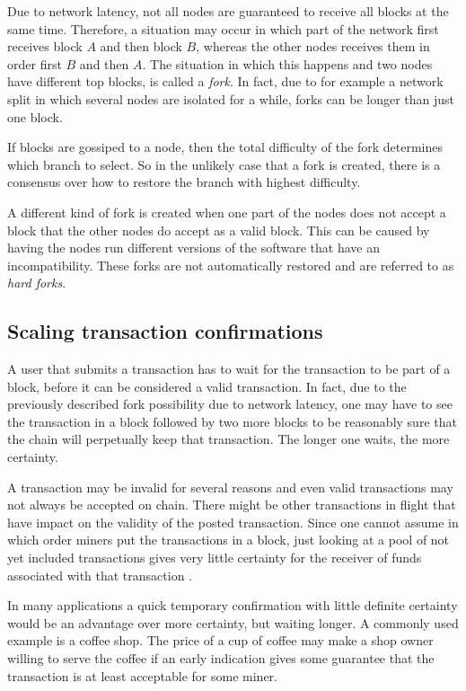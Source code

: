 Due to network latency, not all nodes are guaranteed to receive
all blocks at the same time.  Therefore, a situation may occur in
which part of the network first receives block $A$ and then block $B$,
whereas the other nodes receives them in order first $B$ and then
$A$. The situation in which this happens and two nodes have different
top blocks, is called a \textit{fork}. In fact, due to for example a network
split in which several nodes are isolated for a while, forks can be
longer than just one block.

If blocks are gossiped to a node, then the total
difficulty of the fork determines
which branch to select. So in the unlikely case that a fork is
created, there is a consensus over how to restore the branch with
highest difficulty.

A different kind of fork is created when one part of the nodes does
not accept a block that the other nodes do accept as a valid block. This
can be caused by having the nodes run different versions of the
software that have an incompatibility. These forks are not
automatically restored and are referred to as \textit{hard forks}.

\subsection{Scaling transaction confirmations}

A user that submits a transaction has to wait for the transaction to
be part of a block, before it can be considered a valid
transaction. In fact, due to the previously described fork possibility due
to network latency, one may have to see the transaction in a block
followed by two more blocks to be reasonably sure that the chain will
perpetually keep that transaction. The longer one waits, the more certainty.

A transaction may be invalid for several reasons and even valid
transactions may not always be accepted on chain. There might be other transactions in
flight that have impact on the validity of the posted
transaction. Since one cannot assume in which order miners put
the  transactions in a block, just looking at a pool of not yet
included transactions gives very little certainty for the receiver of
funds associated with that transaction \cite{karame2012double}.

In many applications a quick temporary confirmation with little
definite certainty would be an advantage over more certainty, but
waiting longer. A commonly used example is a coffee shop. The price of
a cup of coffee may make a shop owner willing to serve the coffee if an
early indication gives some guarantee that the transaction is at least
acceptable for some miner.

